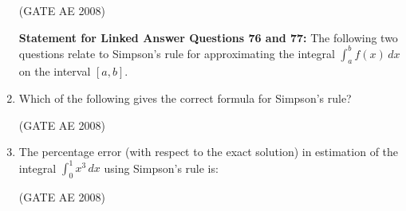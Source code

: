 \documentclass[journal,12pt,onecolumn]{IEEEtran}
\theoremstyle{remark}
\begin{document}
\begin{enumerate}
\begin{enumerate}
\end{enumerate}
\hfill(GATE AE 2008)

\quad 

\textbf{Statement for Linked Answer Questions 76 and 77:} 
The following two questions relate to Simpson's rule for approximating the integral  
$\int_a^b f(x) \, dx$ on the interval $[a, b]$.

\item Which of the following gives the correct formula for Simpson's rule? 

\begin{enumerate}
\end{enumerate}
\hfill(GATE AE 2008)

\quad 

\item The percentage error (with respect to the exact solution) in estimation of the integral  
$\int_{0}^{1} x^3 \, dx$ using Simpson's rule is:  

\begin{enumerate}
\end{enumerate}
\hfill(GATE AE 2008)


\end{enumerate}
\end{document}
